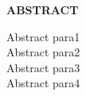 \renewcommand\headrulewidth{0pt}
\begin{center}
\textup{\large{\textbf{ABSTRACT}}}
\end{center}
\begin{flushleft}
\textup{Abstract para1} \\[0.1in]
\textup{Abstract para2} \\[0.1in]
\textup{Abstract para3} \\[0.1in]
\textup{Abstract para4} \\[0.1in]
\end{flushleft}
\pagebreak
